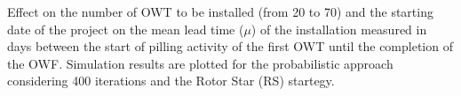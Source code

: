 \label{fig:effectnumber}
Effect on the number of OWT to be installed (from 20 to 70) and the starting date of the project on the mean lead time ($\mu$) of the installation measured in days between the start of pilling activity of the first OWT until the completion of the OWF. Simulation results are plotted for the probabilistic approach considering 400 iterations and the Rotor Star (RS) startegy.